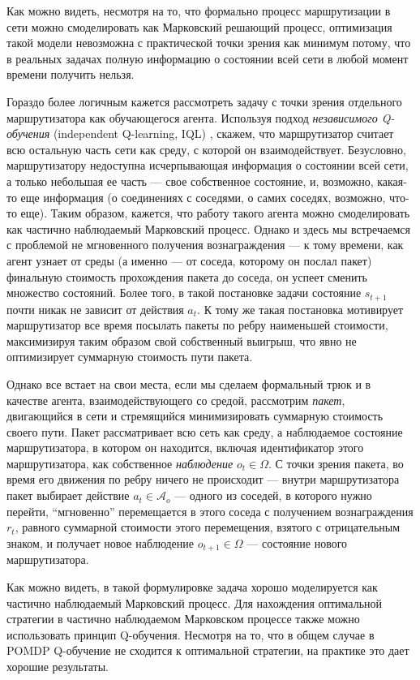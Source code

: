 \documentclass[specification, annotation]{itmo-student-thesis}
\begin{document}
Как можно видеть, несмотря на то, что формально процесс маршрутизации в сети
можно смоделировать как Марковский решающий процесс, оптимизация такой модели
невозможна с практической точки зрения как минимум потому, что в реальных
задачах полную информацию о состоянии всей сети в любой момент времени получить
нельзя.

Гораздо более логичным кажется рассмотреть задачу с точки зрения отдельного
маршрутизатора как обучающегося агента. Используя подход \textit{независимого
  Q-обучения} (independent Q-learning, IQL) \cite{tan1993multi}, скажем, что
маршрутизатор считает всю остальную часть сети как среду, с которой он
взаимодействует. Безусловно, маршрутизатору недоступна исчерпывающая информация
о состоянии всей сети, а только небольшая ее часть --- свое собственное
состояние, и, возможно, какая-то еще информация (о соединениях с соседями, о
самих соседях, возможно, что-то еще). Таким образом, кажется, что работу такого
агента можно смоделировать как частично наблюдаемый Марковский процесс. Однако и
здесь мы встречаемся с проблемой не мгновенного получения вознаграждения --- к
тому времени, как агент узнает от среды (а именно --- от соседа, которому он
послал пакет) финальную стоимость прохождения пакета до соседа, он успеет
сменить множество состояний. Более того, в такой постановке задачи состояние
$s_{t+1}$ почти никак не зависит от действия $a_t$. К тому же такая постановка
мотивирует маршрутизатор все время посылать пакеты по ребру наименьшей
стоимости, максимизируя таким образом свой собственный выигрыш, что явно не
оптимизирует суммарную стоимость пути пакета.

Однако все встает на свои места, если мы сделаем формальный трюк и в качестве
агента, взаимодействующего со средой, рассмотрим \textit{пакет}, двигающийся в
сети и стремящийся минимизировать суммарную стоимость своего пути. Пакет
рассматривает всю сеть как среду, а наблюдаемое состояние маршрутизатора, в
котором он находится, включая идентификатор этого маршрутизатора, как
собственное \textit{наблюдение}  $o_t \in \Omega$. С точки зрения пакета, во время
его движения по ребру ничего не происходит --- внутри маршрутизатора пакет
выбирает действие $a_t \in \mathcal{A}_o$ --- одного из соседей, в которого нужно
перейти, ``мгновенно'' перемещается в этого соседа с получением вознаграждения $r_t$,
равного суммарной стоимости этого перемещения, взятого с отрицательным знаком, и
получает новое наблюдение $o_{t+1} \in \Omega$ --- состояние нового маршрутизатора.

Как можно видеть, в такой формулировке задача хорошо моделируется как частично
наблюдаемый Марковский процесс. Для нахождения оптимальной стратегии в частично
наблюдаемом Марковском процессе также можно использовать принцип Q-обучения.
Несмотря на то, что в общем случае в POMDP Q-обучение не сходится к оптимальной
стратегии, на практике это дает хорошие результаты.
\end{document}
